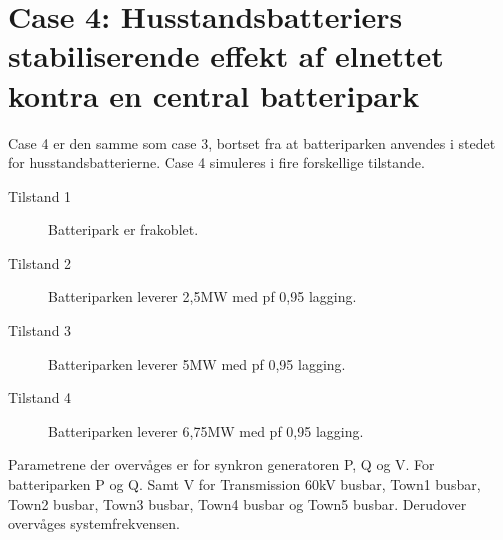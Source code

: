 \section{Case 4: Husstandsbatteriers stabiliserende effekt af elnettet kontra en central batteripark}
Case 4 er den samme som case 3, bortset fra at batteriparken anvendes i stedet for husstandsbatterierne.
Case 4 simuleres i fire forskellige tilstande.

\begin{description}
	\item[Tilstand 1] Batteripark er frakoblet.
	\item[Tilstand 2] Batteriparken leverer 2,5MW med pf 0,95 lagging.
	\item[Tilstand 3] Batteriparken leverer 5MW med pf 0,95 lagging.
	\item[Tilstand 4] Batteriparken leverer 6,75MW med pf 0,95 lagging.
\end{description}

Parametrene der overvåges er for synkron generatoren P, Q og V.
For batteriparken P og Q. Samt V for Transmission 60kV busbar, Town1 busbar, Town2 busbar, Town3 busbar, Town4 busbar og Town5 busbar.
Derudover overvåges systemfrekvensen.
